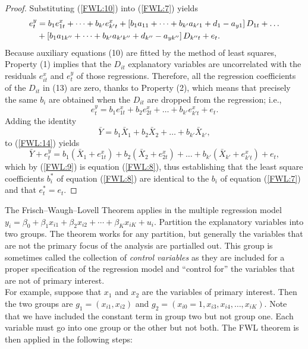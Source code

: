 \documentclass[a4paper, 10pt]{article}
\theoremstyle{definition}	%
\begin{document}
\begin{proof}
Substituting (\ref{FWL:10}) into (\ref{FWL:7}) yields
\begin{align}
    e_t^y &= b_1 e_{1t}^x + \dots + b_{k'} e_{k't}^x + \left[b_1 a_{11} + \dots + b_{k'} a_{k'1} + d_1 - a_{y1}\right] D_{1t} + \dots \notag \\
    &+ \left[b_1 a_{1k''} + \dots + b_{k'} a_{k'k''} + d_{k''} - a_{yk''}\right] D_{k''t} + e_t. 
\end{align}
Because auxiliary equations (10) are fitted by the method of least squares, Property (1) implies that the $D_{it}$ explanatory variables are uncorrelated with the residuals $e_{it}^x$ and $e_t^y$ of those regressions. Therefore, all the regression coefficients of the $D_{it}$ in (13) are zero, thanks to Property (2), which means that precisely the same $b_i$ are obtained when the $D_{it}$ are dropped from the regression; i.e.,
\begin{equation}
e_t^y = b_1 e_{1t}^x + b_2 e_{2t}^x + \dots + b_{k'} e_{k't}^x + e_t. \label{FWL:14}
\end{equation}
Adding the identity 
\[
\bar{Y} = b_1 \bar{X}_1 + b_2 \bar{X}_2 + \dots + b_{k'} \bar{X}_{k'},
\]
to (\ref{FWL:14}) yields
\begin{equation}
\bar{Y} + e_t^y = b_1 \left( \bar{X}_1 + e_{1t}^x \right) + b_2 \left( \bar{X}_2 + e_{2t}^x \right) + \dots + b_{k'} \left( \bar{X}_{k'} + e_{k't}^x \right) + e_t,
\end{equation}
which by (\ref{FWL:9}) is equation (\ref{FWL:8}), thus establishing that the least square coefficients $b_i^*$ of equation (\ref{FWL:8}) are identical to the $b_i$ of equation (\ref{FWL:7}) and that $e_t^* = e_t$.
\end{proof}
The Frisch--Waugh--Lovell Theorem applies in the multiple regression model $y_i = \beta_0 + \beta_1 x_{i1} + \beta_2 x_{i2} + \cdots + \beta_K x_{iK} + u_i$. Partition the explanatory variables into two groups. The theorem works for any partition, but generally the variables that are not the primary focus of the analysis are partialled out. This group is sometimes called the collection of \textit{control variables} as they are included for a proper specification of the regression model and ``control for'' the variables that are not of primary interest.\\
For example, suppose that $x_1$ and $x_2$ are the variables of primary interest. Then the two groups are $g_1 = (x_{i1}, x_{i2})$ and $g_2 = (x_{i0} = 1, x_{i3}, x_{i4}, \dots, x_{iK})$. Note that we have included the constant term in group two but not group one. Each variable must go into one group or the other but not both. The FWL theorem is then applied in the following steps:
\end{document}
